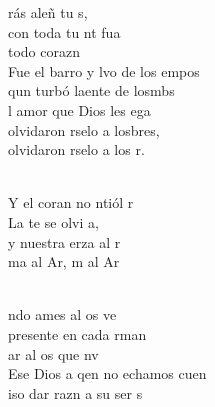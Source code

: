 \begin{cancion}%
	rás aleñ tu s, \\
	con toda tu nt fua\\
	 todo  corazn   \\
\jump
	Fue el barro y lvo de los empos\\
	qun turbó laente de losmbs \\
	l amor que Dios les ega \\
	olvidaron rselo a losbres,\\
	olvidaron rselo a los r. \\\jump\\
	\begin{chorus}%
	Y el coran no ntiól r \\
	La te se olvi a,\\
	y nuestra erza al r\\
	ma al Ar, m al Ar  \\
	\end{chorus}%
	\jump\\
	ndo ames al os  ve\\
	presente en cada rman \\
	ar al os que nv   \\
\jump
	Ese Dios a qen no echamos cuen\\
	iso dar razn a su ser s\\

\end{cancion}
